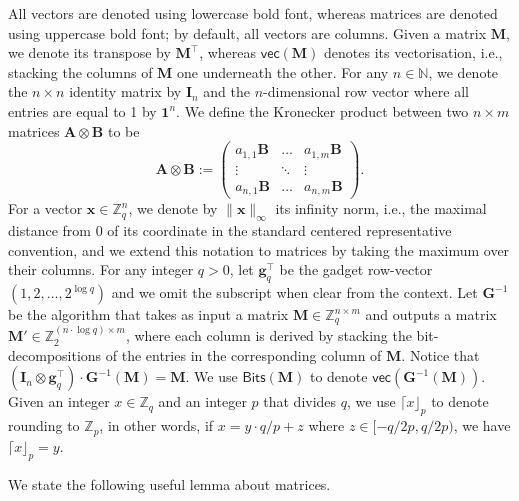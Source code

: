 \documentclass{article}
\newcommand{\N}{\mathbb{N}}
\newcommand{\Z}{\mathbb{Z}}
\newcommand{\id}{\ensuremath{\mathbf{I}}}
\begin{document}
All vectors are denoted using lowercase bold font, whereas matrices are denoted using uppercase bold font; by default, all vectors are columns.
Given a matrix $\mathbf{M}$, we denote its transpose by $\mathbf{M}^\intercal$, whereas $\mathsf{vec}(\mathbf{M})$ denotes its vectorisation, i.e., stacking the columns of $\mathbf{M}$ one underneath the other. For any $n\in\N$, we denote the $n\times n$ identity matrix by $\id_n$ and the $n$-dimensional row vector where all entries are equal to 1 by $\mathbf{1}^n$. We define the Kronecker product between two $n\times m$ matrices $\mathbf{A} \otimes \mathbf{B}$ to be
\[
\mathbf{A} \otimes \mathbf{B} := \begin{pmatrix}
    a_{1,1}\mathbf{B} &\dots& a_{1,m}\mathbf{B}\\
    \vdots &\ddots& \vdots\\
    a_{n,1}\mathbf{B} &\dots& a_{n,m}\mathbf{B}
\end{pmatrix}.
\]
For a vector $\mathbf{x}\in \Z_q^n$, we denote by $\|\mathbf{x}\|_{\infty}$ its infinity norm, i.e., {the maximal distance from $0$ of its coordinate in the standard centered representative convention,} and we extend this notation to matrices by taking the maximum over their columns. 
For any integer $q>0$, let $\mathbf{g}_q^\intercal$ be the gadget row-vector $(1, 2, \dots, 2^{\log q})$ and we omit the subscript when clear from the context. Let $\mathbf{G}^{-1}$ be the algorithm that takes as input a matrix $\mathbf{M}\in\Z_q^{n\times m}$ and outputs a matrix $\mathbf{M}'\in\Z_2^{(n\cdot \log q)\times m}$, where each column is derived by stacking the bit-decompositions of the entries in the corresponding column of $\mathbf{M}$. Notice that $(\id_n\otimes \mathbf{g}_q^\intercal)\cdot \mathbf{G}^{-1}(\mathbf{M})=\mathbf{M}$. We use $\mathsf{Bits}(\mathbf{M})$ to denote $\mathsf{vec}(\mathbf{G}^{-1}(\mathbf{M}))$.
Given an integer $x\in\Z_q$ and an integer $p$ that divides $q$, we use $\lceil x \rfloor_p$ to denote rounding to $\Z_p$, in other words, if $x=y\cdot q/p+z$ where $ z\in[ -q/2p, q/2p)$, we have $\lceil x \rfloor_p=y$.

We state the following useful lemma about matrices.
\end{document}
